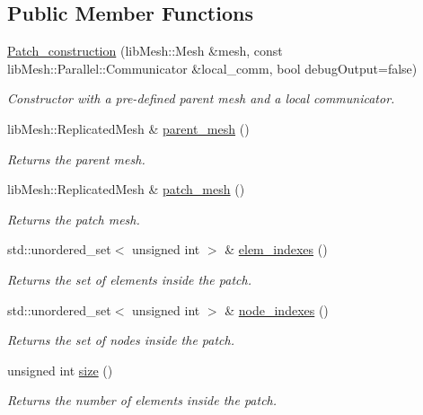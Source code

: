 \subsection*{Public Member Functions}
\begin{DoxyCompactItemize}
\item 
\hyperlink{classcarl_1_1_patch__construction_ad112ac39bae272dc1572845ea5357ced}{Patch\+\_\+construction} (lib\+Mesh\+::\+Mesh \&mesh, const lib\+Mesh\+::\+Parallel\+::\+Communicator \&local\+\_\+comm, bool debug\+Output=false)
\begin{DoxyCompactList}\small\item\em Constructor with a pre-\/defined parent mesh and a local communicator. \end{DoxyCompactList}\item 
lib\+Mesh\+::\+Replicated\+Mesh \& \hyperlink{classcarl_1_1_patch__construction_a5e7fcbfddff00bd9cb431daf8288fd5a}{parent\+\_\+mesh} ()
\begin{DoxyCompactList}\small\item\em Returns the parent mesh. \end{DoxyCompactList}\item 
lib\+Mesh\+::\+Replicated\+Mesh \& \hyperlink{classcarl_1_1_patch__construction_a2b8840ec8f710a61d94638c6598e5a76}{patch\+\_\+mesh} ()
\begin{DoxyCompactList}\small\item\em Returns the patch mesh. \end{DoxyCompactList}\item 
std\+::unordered\+\_\+set$<$ unsigned int $>$ \& \hyperlink{classcarl_1_1_patch__construction_ad92eca042b223e8be1cb3984a3dc8cba}{elem\+\_\+indexes} ()
\begin{DoxyCompactList}\small\item\em Returns the set of elements inside the patch. \end{DoxyCompactList}\item 
std\+::unordered\+\_\+set$<$ unsigned int $>$ \& \hyperlink{classcarl_1_1_patch__construction_a36b55aaf8de17b8c00612907d159979e}{node\+\_\+indexes} ()
\begin{DoxyCompactList}\small\item\em Returns the set of nodes inside the patch. \end{DoxyCompactList}\item 
unsigned int \hyperlink{classcarl_1_1_patch__construction_ab9183c2cdf61de07aa77b91775286733}{size} ()
\begin{DoxyCompactList}\small\item\em Returns the number of elements inside the patch. \end{DoxyCompactList}\item 

\end{DoxyCompactItemize}
